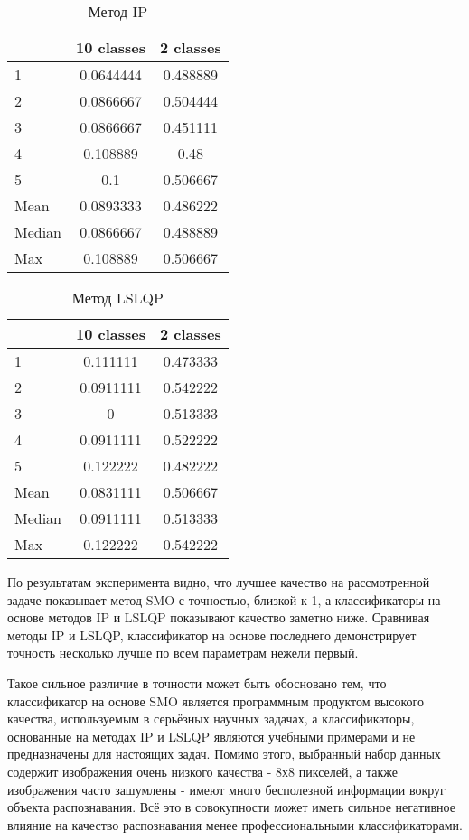\documentclass[main.tex]{subfiles}
\begin{document}
\begin{table}[H]
    \centering
    \begin{tabular}{|l||c|c|}
        \hline
        & 10 classes & 2 classes \\\hline\hline
        1 & 0.0644444 & 0.488889 \\\hline
        2 & 0.0866667 & 0.504444 \\\hline
        3 & 0.0866667 & 0.451111 \\\hline
        4 & 0.108889 & 0.48 \\\hline
        5 & 0.1 & 0.506667 \\\hline
        Mean & 0.0893333 & 0.486222 \\\hline
        Median & 0.0866667 & 0.488889 \\\hline
        Max & 0.108889 & 0.506667 \\\hline
    \end{tabular}
    \caption{Метод IP}
\end{table}

\begin{table}[H]
    \centering
    \begin{tabular}{|l||c|c|}
        \hline
        & 10 classes & 2 classes \\\hline\hline
        1 & 0.111111 & 0.473333 \\\hline
        2 & 0.0911111 & 0.542222 \\\hline
        3 & 0 & 0.513333 \\\hline
        4 & 0.0911111 & 0.522222 \\\hline
        5 & 0.122222 & 0.482222 \\\hline
        Mean & 0.0831111 & 0.506667 \\\hline
        Median & 0.0911111 & 0.513333 \\\hline
        Max & 0.122222 & 0.542222 \\\hline
    \end{tabular}
    \caption{Метод LSLQP}
\end{table}

По результатам эксперимента видно, что лучшее качество на рассмотренной задаче показывает метод SMO с точностью, близкой к 1, а классификаторы на основе методов IP и LSLQP показывают качество заметно ниже. Сравнивая методы IP и LSLQP, классификатор на основе последнего демонстрирует точность несколько лучше по всем параметрам нежели первый.

Такое сильное различие в точности может быть обосновано тем, что классификатор на основе SMO является программным продуктом высокого качества, используемым в серьёзных научных задачах, а классификаторы, основанные на методах IP и LSLQP являются учебными примерами и не предназначены для настоящих задач. Помимо этого, выбранный набор данных содержит изображения очень низкого качества - 8х8 пикселей, а также изображения часто зашумлены - имеют много бесполезной информации вокруг объекта распознавания. Всё это в совокупности может иметь сильное негативное влияние на качество распознавания менее профессиональными классификаторами.
\end{document}
